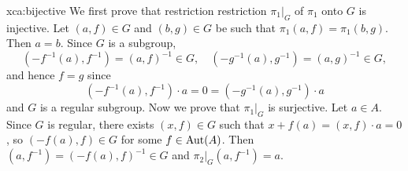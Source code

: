 \begin{sol}{xca:bijective}
	We first prove that restriction restriction $\pi_1|_G$ of $\pi_1$ onto $G$ is injective. Let $(a,f)\in G$ and $(b,g)\in G$
	be such that 
	$\pi_1(a,f)=\pi_1(b,g)$. Then $a=b$. Since $G$ is a
	subgroup, 
	\[
		(-f^{-1}(a),f^{-1})=(a,f)^{-1}\in G,
	    \quad
		(-g^{-1}(a),g^{-1})=(a,g)^{-1}\in G,
	\]
	and hence $f=g$ since
	\[
	(-f^{-1}(a),f^{-1})\cdot a=0=(-g^{-1}(a),g^{-1})\cdot a 
	\]
	and $G$ is a regular subgroup.
	Now we prove that $\pi_1|_G$ is surjective. Let $a\in A$. 
	Since $G$ is regular, there exists $(x,f)\in G$ such that $x+f(a)=(x,f)\cdot a=0$, so $(-f(a),f)\in G$ for some $f\in\operatorname{Aut}(A)$. 
	Then $(a,f^{-1})=(-f(a),f)^{-1}\in G$ and $\pi_2|_G(a,f^{-1})=a$. 
\end{sol}


